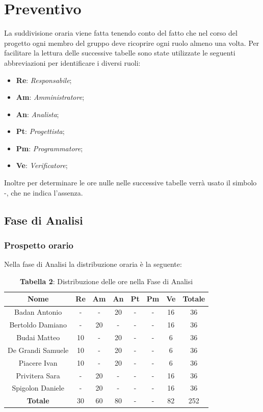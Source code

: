 \section{Preventivo}
La suddivisione oraria viene fatta tenendo conto del fatto che nel corso del progetto ogni  membro del gruppo deve ricoprire ogni ruolo almeno una volta.
Per facilitare la lettura delle successive tabelle sono state utilizzate le seguenti abbreviazioni per identificare i diversi ruoli:
\begin{itemize}
	\item \textbf{Re}: \textit{Responsabile};
	\item \textbf{Am}: \textit{Amministratore};
	\item \textbf{An}: \textit{Analista};
	\item \textbf{Pt}: \textit{Progettista};
	\item \textbf{Pm}: \textit{Programmatore};
	\item \textbf{Ve}: \textit{Verificatore};
\end{itemize}
Inoltre per determinare le ore nulle nelle successive tabelle verrà usato il simbolo -, che ne indica l'assenza.

\subsection{Fase di Analisi}
\subsubsection{Prospetto orario}
Nella fase di Analisi la distribuzione oraria è la seguente:
\begin{table}[H]
	\centering
	\renewcommand{\arraystretch}{1.5}
	\begin{tabular}{|c|c|c|c|c|c|c|c|}
		\hline
		\rowcolor{lighter-grayer}
		Nome & Re & Am & An & Pt & Pm & Ve & Totale\\
		\hline
		
Badan Antonio     & - & - & 20 & - & - & 16 & 36  \\ \hline
Bertoldo Damiano  & - & 20 & - & - & - & 16 & 36  \\ \hline
Budai Matteo      & 10 & - & 20 & - & - & 6  & 36  \\ \hline
De Grandi Samuele & 10 & - & 20 & - & - & 6  & 36  \\ \hline
Piacere Ivan      & 10 & - & 20 & - & - & 6  & 36  \\ \hline
Privitera Sara    & - & 20 & - & - & - & 16 & 36  \\ \hline
Spigolon Daniele  & - & 20 & - & - & - & 16 & 36  \\ \hline
\textbf{Totale}   & 30 & 60 & 80 & - & - & 82 & 252 \\ \hline
		
\end{tabular}
\caption*{\textbf{Tabella 2}: Distribuzione delle ore nella Fase di Analisi\\}
\end{table}	

